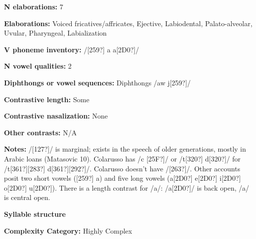 \begin{styleBody}
\textbf{N elaborations:} 7
\end{styleBody}

\begin{styleBody}
\textbf{Elaborations:} Voiced fricatives/affricates, Ejective, Labiodental, Palato-alveolar, Uvular, Pharyngeal, Labialization
\end{styleBody}

\begin{styleBody}
\textbf{V phoneme inventory:} /[259?] a a[2D0?]/
\end{styleBody}

\begin{styleBody}
\textbf{N vowel qualities:} 2
\end{styleBody}

\begin{styleBody}
\textbf{Diphthongs or vowel sequences:} Diphthongs /aw j[259?]/
\end{styleBody}

\begin{styleBody}
\textbf{Contrastive length:} Some
\end{styleBody}

\begin{styleBody}
\textbf{Contrastive nasalization:} None
\end{styleBody}

\begin{styleBody}
\textbf{Other contrasts:} N/A
\end{styleBody}

\begin{styleBody}
\textbf{Notes:} /[127?]/ is marginal; exists in the speech of older generations, mostly in Arabic loans (Matasovic 10). Colarusso has /c [25F?]/ or /t[320?] d[320?]/ for /t[361?][283?] d[361?][292?]/. Colarusso doesn’t have /[263?]/. Other accounts posit two short vowels ([259?] a) and five long vowels (a[2D0?] e[2D0?] i[2D0?] o[2D0?] u[2D0?]). There is a length contrast for /a/: /a[2D0?]/ is back open, /a/ is central open.
\end{styleBody}

\begin{styleBody}
\textbf{Syllable structure}
\end{styleBody}

\begin{styleBody}
\textbf{Complexity Category:} Highly Complex
\end{styleBody}

